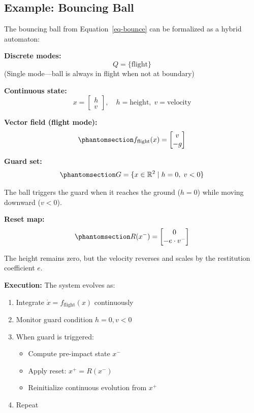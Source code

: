 \documentclass[
  letterpaper,
  DIV=11,
  numbers=noendperiod]{scrartcl}
\providecommand{\tightlist}{%
  \setlength{\itemsep}{0pt}\setlength{\parskip}{0pt}}\usepackage{longtable,booktabs,array}
\begin{document}
\subsection{Example: Bouncing Ball}\label{example-bouncing-ball}

The bouncing ball from Equation~\ref{eq-bounce} can be formalized as a
hybrid automaton:

\textbf{Discrete modes:} \[
Q = \{\text{flight}\}
\] (Single mode---ball is always in flight when not at boundary)

\textbf{Continuous state:} \[
x = \begin{bmatrix} h \\ v \end{bmatrix}, \quad h = \text{height}, \; v = \text{velocity}
\]

\textbf{Vector field (flight mode):}
\begin{equation}\phantomsection\label{eq-ball-flight}{
f_{\text{flight}}(x) = \begin{bmatrix} v \\ -g \end{bmatrix}
}\end{equation}

\textbf{Guard set:}
\begin{equation}\phantomsection\label{eq-ball-guard}{
G = \{x \in \mathbb{R}^2 \mid h = 0, \; v < 0\}
}\end{equation}

The ball triggers the guard when it reaches the ground (\(h = 0\)) while
moving downward (\(v < 0\)).

\textbf{Reset map:}
\begin{equation}\phantomsection\label{eq-ball-reset}{
R(x^-) = \begin{bmatrix} 0 \\ -e \cdot v^- \end{bmatrix}
}\end{equation}

The height remains zero, but the velocity reverses and scales by the
restitution coefficient \(e\).

\textbf{Execution:} The system evolves as:

\begin{enumerate}
\def\labelenumi{\arabic{enumi}.}
\tightlist
\item
  Integrate \(\dot{x} = f_{\text{flight}}(x)\) continuously
\item
  Monitor guard condition \(h = 0, v < 0\)
\item
  When guard is triggered:

  \begin{itemize}
  \tightlist
  \item
    Compute pre-impact state \(x^-\)
  \item
    Apply reset: \(x^+ = R(x^-)\)
  \item
    Reinitialize continuous evolution from \(x^+\)
  \end{itemize}
\item
  Repeat
\end{enumerate}
\end{document}
